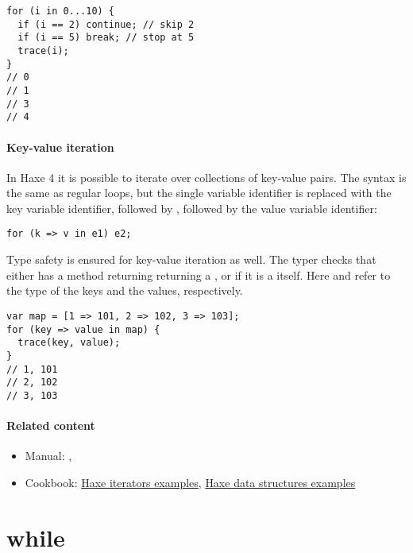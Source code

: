 \begin{lstlisting}
for (i in 0...10) {
  if (i == 2) continue; // skip 2
  if (i == 5) break; // stop at 5
  trace(i);
}
// 0
// 1
// 3
// 4
\end{lstlisting}


\paragraph{Key-value iteration}
\label{expression-for-keyvalue}

In Haxe 4 it is possible to iterate over collections of key-value pairs. The syntax is the same as regular  loops, but the single variable identifier is replaced with the key variable identifier, followed by \expr{=>}, followed by the value variable identifier:

\begin{lstlisting}
for (k => v in e1) e2;
\end{lstlisting}

Type safety is ensured for key-value iteration as well. The typer checks that  either has a  method returning returning a , or if it is a  itself. Here  and  refer to the type of the keys and the values, respectively.

\begin{lstlisting}
var map = [1 => 101, 2 => 102, 3 => 103];
for (key => value in map) {
  trace(key, value);
}
// 1, 101
// 2, 102
// 3, 103
\end{lstlisting}

\paragraph{Related content}
\begin{itemize}
	\item Manual: , 
	\item Cookbook: \href{http://code.haxe.org/tag/iterator.html}{Haxe iterators examples}, \href{http://code.haxe.org/tag/data-structures.html}{Haxe data structures examples}
\end{itemize}

\section{while}
\label{expression-while}

